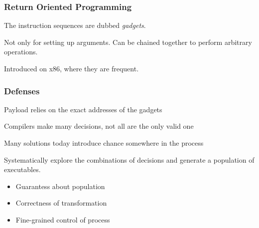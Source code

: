 \begin{frame}
	\frametitle{Return Oriented Programming}

	The instruction sequences are dubbed \textit{gadgets}.

	\vspace{0.5cm}

	Not only for setting up arguments. Can be chained together to perform arbitrary operations.

	\vspace{0.5cm}

	Introduced on x86, where they are frequent.

\end{frame}

\begin{frame}
	\frametitle{Defenses}

	Payload relies on the exact addresses of the gadgets

	\vspace{0.5cm}

	Compilers make many decisions, not all are the only valid one

	\vspace{0.5cm}

	Many solutions today introduce chance somewhere in the process

	\vspace{0.5cm}

	Systematically explore the combinations of decisions and generate a population of executables.

	\begin{itemize}
		\item Guarantess about population
		\item Correctness of transformation
		\item Fine-grained control of process
	\end{itemize}

\end{frame}
